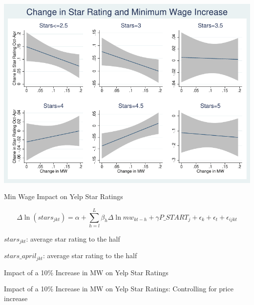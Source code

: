 \documentclass[xcolor=table]{beamer}
\newcommand\Wider[2][4em]{%
\makebox[\linewidth][c]{%
  \begin{minipage}{\dimexpr\textwidth+#1\relax}
  \raggedright#2
  \end{minipage}%
  }%
}
\begin{document}
\begin{spacing}{1.2}
\begin{frame}
\centering
\includegraphics[scale=.75]{stars_lfits.pdf}

\end{frame}

\begin{frame}{Min Wage Impact on Yelp Star Ratings}

\begin{dmath}
\Delta \ln(stars_{jkt}) = \alpha + \sum_{h=l}^{L}\beta_h \Delta \ln mw_{kt-h}  + \gamma  P\_START_{j} + \epsilon_k + \epsilon_t + \epsilon_{ijkt}
\end{dmath}

$stars_{jkt}$: average star rating to the half

$stars\_april_{jkt}$: average star rating to the half


\end{frame}


\begin{frame}{Impact of a 10\% Increase in MW on Yelp Star Ratings}

\Wider{
\centering
\tiny

}
\end{frame}

\begin{frame}{Impact of a 10\% Increase in MW on Yelp Star Ratings: Controlling for price increase}

\Wider{
\centering
\tiny

}
\end{frame}




\end{spacing}
\end{document}
